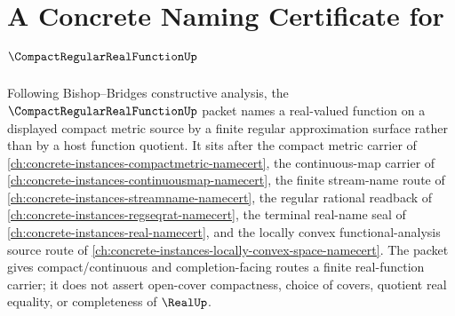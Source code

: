 \chapter{A Concrete Naming Certificate for $\CompactRegularRealFunctionUp$}
\label{ch:concrete-instances-compact-regular-real-function-namecert}

Following Bishop--Bridges constructive analysis, the $\CompactRegularRealFunctionUp$ packet names a real-valued function on a displayed compact metric source by a finite regular approximation surface rather than by a host function quotient. It sits after the compact metric carrier of \autoref{ch:concrete-instances-compactmetric-namecert}, the continuous-map carrier of \autoref{ch:concrete-instances-continuousmap-namecert}, the finite stream-name route of \autoref{ch:concrete-instances-streamname-namecert}, the regular rational readback of \autoref{ch:concrete-instances-regseqrat-namecert}, the terminal real-name seal of \autoref{ch:concrete-instances-real-namecert}, and the locally convex functional-analysis source route of \autoref{ch:concrete-instances-locally-convex-space-namecert}. The packet gives compact/continuous and completion-facing routes a finite real-function carrier; it does not assert open-cover compactness, choice of covers, quotient real equality, or completeness of $\RealUp$.

